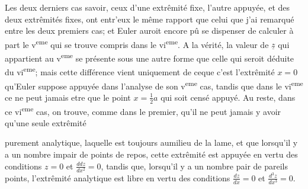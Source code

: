 \documentclass[11pt,a4paper]{article}
\begin{document}
Les deux derniers cas savoir, ceux d'une extrêmité fixe, l'autre
appuyée, et des deux extrêmités fixes, ont entr'eux le même
rapport que celui que j'ai remarqué entre les deux premiers
cas; et Euler auroit encore pû se dispenser de calculer
à part le v\textsuperscript{eme} qui se trouve compris dans le vi\textsuperscript{eme}.
A la vérité, la valeur de $\underline{z}$ qui appartient au v\textsuperscript{eme}
se présente sous une autre forme que celle qui seroit
déduite du vi\textsuperscript{eme}; mais cette différence vient uniquement
de ceque c'est l'extrêmité $x=0$ qu'Euler suppose
appuyée dans l'analyse de son v\textsuperscript{eme} cas, tandis que
dans le vi\textsuperscript{eme} ce ne peut jamais etre que le point
$x=\frac{1}{2}a$ qui soit censé appuyé. Au reste, dans ce
vi\textsuperscript{eme} cas, on trouve, comme dans le premier, qu'il
ne peut jamais y avoir qu'une seule extrêmité


purement analytique, laquelle est toujours aumilieu de
la lame, et que lorsqu'il y a un nombre impair de points
de repos, cette extrêmité est appuyée en vertu des
conditions $z=0$ et $\frac{ddz}{dx^2}=0$, tandis que, lorsqu'il y a un
nombre pair de pareils points, l'extrêmité analytique
est libre en vertu des conditions $\frac{dz}{dx}=0$ et $\frac{d^3z}{dx^3}=0$.
\end{document}
